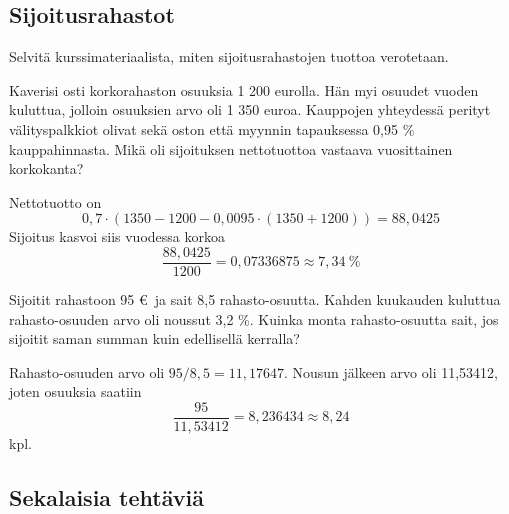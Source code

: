 \documentclass{article}\usepackage[]{graphicx}\usepackage[]{color}
\begin{document}
\subsection*{Sijoitusrahastot}

\begin{question} Selvitä kurssimateriaalista, miten sijoitusrahastojen tuottoa verotetaan.

\end{question}

\begin{question} 
    Kaverisi osti korkorahaston osuuksia 1 200 eurolla. Hän myi osuudet vuoden kuluttua, jolloin osuuksien arvo oli 1 350 euroa. Kauppojen yhteydessä perityt välityspalkkiot olivat sekä oston että myynnin tapauksessa 0{,}95 \% kauppahinnasta. Mikä oli sijoituksen nettotuottoa vastaava vuosittainen korkokanta?
\end{question}
\begin{solution}
    Nettotuotto on 
    \[
        0,7\cdot(1350 - 1200 - 0,0095\cdot(1350+1200)) = 88{,}0425
    \]
    Sijoitus kasvoi siis vuodessa korkoa
    \[
        \frac{88{,}0425}{1200} = 0{,}07336875 \approx 7{,}34~\%
    \]
\end{solution}

\begin{question} 
    Sijoitit rahastoon 95 \euro\ ja sait 8{,}5 rahasto-osuutta. Kahden kuukauden kuluttua rahasto-osuuden arvo oli noussut 3{,}2 \%. Kuinka monta rahasto-osuutta sait, jos sijoitit saman summan kuin edellisellä kerralla?
\end{question}
\begin{solution}
    Rahasto-osuuden arvo oli \(95/8,5 = 11{,}17647\). Nousun jälkeen arvo oli 11{,}53412, joten osuuksia saatiin
    \[
        \frac{95}{11{,}53412} = 8{,}236434 \approx 8{,}24
    \]
    kpl.
\end{solution}

\subsection*{Sekalaisia tehtäviä}
\end{document}
